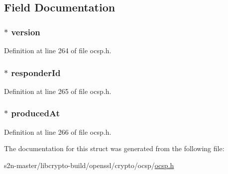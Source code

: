 \subsection{Field Documentation}
\subsubsection[{\texorpdfstring{version}{version}}]{ $\ast$ version}\hypertarget{structocsp__response__data__st_abf367aeef355b6acf5be7c569c4b28b0}{}\label{structocsp__response__data__st_abf367aeef355b6acf5be7c569c4b28b0}


Definition at line 264 of file ocsp.\+h.

\subsubsection[{\texorpdfstring{responder\+Id}{responderId}}]{ $\ast$ responder\+Id}\hypertarget{structocsp__response__data__st_ab1e4e066c8a6d098bdf19c8e99abac47}{}\label{structocsp__response__data__st_ab1e4e066c8a6d098bdf19c8e99abac47}


Definition at line 265 of file ocsp.\+h.

\subsubsection[{\texorpdfstring{produced\+At}{producedAt}}]{ $\ast$ produced\+At}\hypertarget{structocsp__response__data__st_ac2ac43e93f6f75d48622b75d1036bf1d}{}\label{structocsp__response__data__st_ac2ac43e93f6f75d48622b75d1036bf1d}


Definition at line 266 of file ocsp.\+h.



The documentation for this struct was generated from the following file\+:\begin{DoxyCompactItemize}
\item 
s2n-\/master/libcrypto-\/build/openssl/crypto/ocsp/\hyperlink{crypto_2ocsp_2ocsp_8h}{ocsp.\+h}\end{DoxyCompactItemize}
